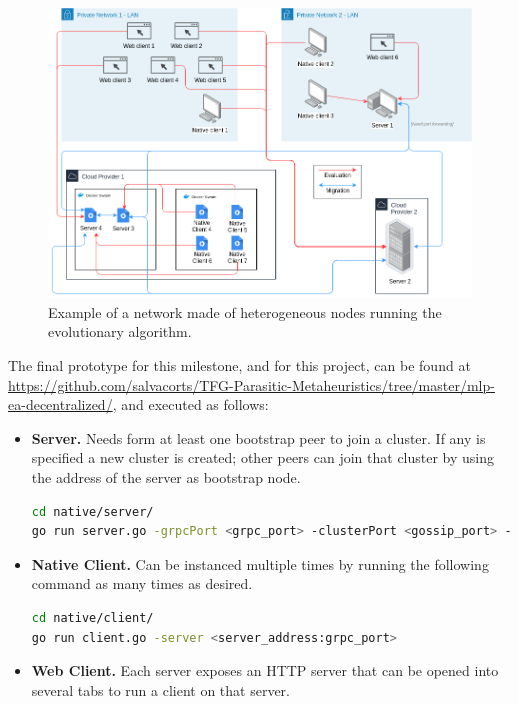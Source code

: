 \begin{figure}[h!]
		\centering
    	\includegraphics[width=\linewidth]{assets/images/tfg-net.png}
    	\caption{Example of a network made of heterogeneous nodes running the evolutionary algorithm.}
    	\label{fig:tfg-net}
\end{figure}

The final prototype for this milestone, and for this project, can be found at \href{github.com/salvacorts/TFG-Parasitic-Metaheuristics/tree/master/mlp-ea-centralized/common}{https://github.com/salvacorts/TFG-Parasitic-Metaheuristics/tree/master/mlp-ea-decentralized/}, and executed as follows:

\begin{itemize}
	\item \textbf{Server.} Needs form at least one bootstrap peer to join a cluster. If any is specified a new cluster is created; other peers can join that cluster by using the address of the server as bootstrap node.
\begin{lstlisting}[language=bash]
cd native/server/
go run server.go -grpcPort <grpc_port> -clusterPort <gossip_port> -clusterBoostrap <peer1_addr:peer1_gossip_port,peer2_addr:peer2_gossip_port>
\end{lstlisting}

	\item \textbf{Native Client.} Can be instanced multiple times by running the following command as many times as desired.
\begin{lstlisting}[language=bash]
cd native/client/
go run client.go -server <server_address:grpc_port>
\end{lstlisting}

	\item \textbf{Web Client.} Each server exposes an HTTP server that can be opened into several tabs to run a client on that server.
\end{itemize}

